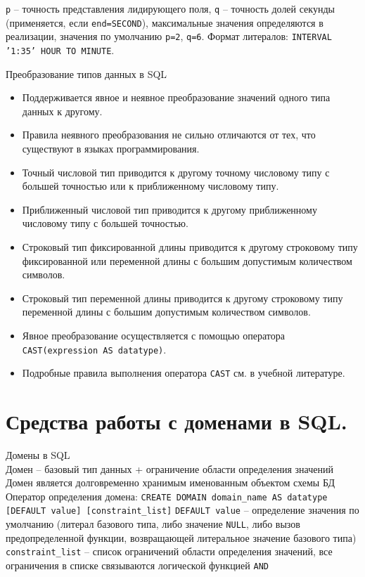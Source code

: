 \documentclass[a4paper,12pt]{article}
\begin{document}
\texttt{p} – точность представления лидирующего поля, \texttt{q} – точность долей секунды (применяется, если \texttt{end=SECOND}), максимальные значения определяются в реализации, значения по умолчанию \texttt{p=2}, \texttt{q=6}.  
Формат литералов: \texttt{INTERVAL '1:35' HOUR TO MINUTE}.

Преобразование типов данных в SQL  
\begin{itemize}
    \item Поддерживается явное и неявное преобразование значений одного типа данных к другому.
    \item Правила неявного преобразования не сильно отличаются от тех, что существуют в языках программирования.
    \item Точный числовой тип приводится к другому точному числовому типу с большей точностью или к приближенному числовому типу.
    \item Приближенный числовой тип приводится к другому приближенному числовому типу с большей точностью.
    \item Строковый тип фиксированной длины приводится к другому строковому типу фиксированной или переменной длины с большим допустимым количеством символов.
    \item Строковый тип переменной длины приводится к другому строковому типу переменной длины с большим допустимым количеством символов.
    \item Явное преобразование осуществляется с помощью оператора \texttt{CAST(expression AS datatype)}.
    \item Подробные правила выполнения оператора \texttt{CAST} см. в учебной литературе.
\end{itemize}

\section{Средства работы с доменами в SQL.}

Домены в SQL  \\
Домен – базовый тип данных + ограничение области определения значений \\  
Домен является долговременно хранимым именованным объектом схемы БД  \\
Оператор определения домена:  
\texttt{CREATE DOMAIN domain\_name AS datatype [DEFAULT value] [constraint\_list]}  
\texttt{DEFAULT value} – определение значения по умолчанию (литерал базового типа, либо значение \texttt{NULL}, либо вызов предопределенной функции, возвращающей литеральное значение базового типа)  
\texttt{constraint\_list} – список ограничений области определения значений, все ограничения в списке связываются логической функцией \texttt{AND}
\end{document}
